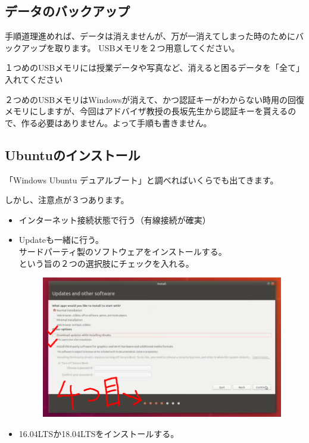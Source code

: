 \documentclass[11pt,a4paper]{jsarticle}
\begin{document}
\subsection{データのバックアップ}
手順道理進めれば、データは消えませんが、万が一消えてしまった時のためにバックアップを取ります。
USBメモリを２つ用意してください。

１つめのUSBメモリには授業データや写真など、消えると困るデータを「全て」入れてください

２つめのUSBメモリはWindowsが消えて、かつ認証キーがわからない時用の回復メモリにしますが、今回はアドバイザ教授の長坂先生から認証キーを貰えるので、作る必要はありません。よって手順も書きません。

\subsection{Ubuntuのインストール}
「Windows Ubuntu デュアルブート」と調べればいくらでも出てきます。

\color{red}
しかし、注意点が３つあります。
\begin{itemize}
  \item インターネット接続状態で行う（有線接続が確実）
  \item Updateも一緒に行う。\\サードパーティ製のソフトウェアをインストールする。\\という旨の２つの選択肢にチェックを入れる。
  \begin{figure}[h]
    \begin{center}
      \includegraphics[width=128mm]{./install_caution.png}
    \end{center}
    \caption{}
    \label{graph3}
  \end{figure}
  \item 16.04LTSか18.04LTSをインストールする。
\end{itemize}
\end{document}
